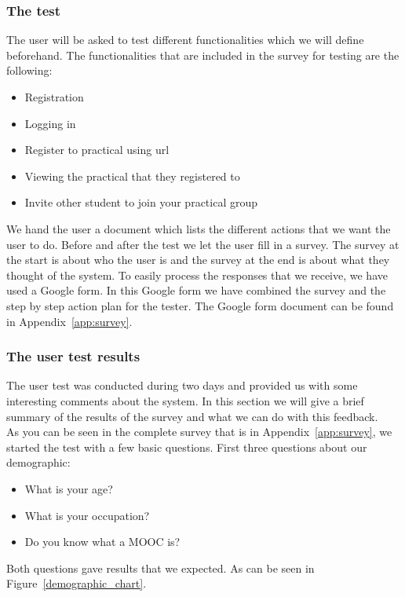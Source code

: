 \subsubsection{The test}
The user will be asked to test different functionalities which we will define beforehand.
The functionalities that are included in the survey for testing are the following:
\begin{itemize}
\item Registration
\item Logging in
\item Register to practical using url
\item Viewing the practical that they registered to
\item Invite other student to join your practical group
\end{itemize}
We hand the user a document which lists the different actions that we want the user to do.
Before and after the test we let the user fill in a survey.
The survey at the start is about who the user is and the survey at the end is about what they thought of the system.
To easily process the responses that we receive, we have used a Google form.
In this Google form we have combined the survey and the step by step action plan for the tester.
The Google form document can be found in Appendix~\ref{app:survey}.

\subsubsection{The user test results}
The user test was conducted during two days and provided us with some interesting comments about the system.
In this section we will give a brief summary of the results of the survey and what we can do with this feedback.\\

As you can be seen in the complete survey that is in Appendix~\ref{app:survey}, we started the test with a few basic questions.
First three questions about our demographic:
\begin{itemize}
\item What is your age?
\item What is your occupation?
\item Do you know what a MOOC is?
\end{itemize}

Both questions gave results that we expected.
As can be seen in Figure~\ref{demographic_chart}.

